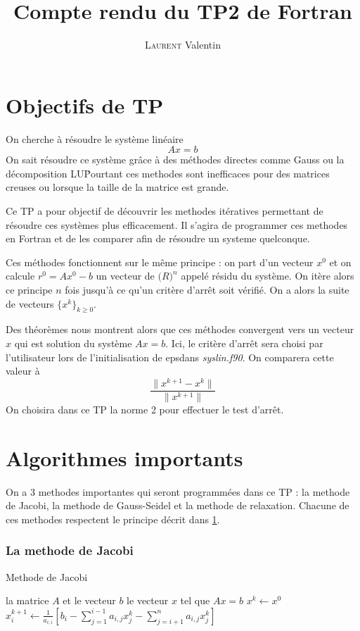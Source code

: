 \documentclass{report}
\title{Compte rendu du TP2 de Fortran}
\author{\textsc{Laurent} Valentin}
\begin{document}
\maketitle

\tableofcontents

\setcounter{chapter}{1}
\newpage
\section{Objectifs de TP}\label{objectifs}
On cherche à résoudre le système linéaire
\begin{displaymath}
Ax = b
\end{displaymath}
On sait résoudre ce système grâce à des méthodes directes comme Gauss ou la décomposition LU\.
Pourtant ces methodes sont inefficaces pour des matrices creuses ou lorsque la taille de la matrice
est grande.

Ce TP a pour objectif de découvrir les methodes itératives permettant de résoudre ces systèmes plus efficacement.
Il s'agira de programmer ces methodes en Fortran et de les comparer afin de résoudre un systeme quelconque.

Ces méthodes fonctionnent sur le même principe : on part d'un vecteur $x^0$ et on calcule $r^0 = Ax^0-b$ un vecteur
de $\mathbb(R)^n$ appelé résidu du système. On itère alors ce principe $n$ fois jusqu'à ce qu'un critère d'arrêt soit 
vérifié. On a alors la suite de vecteurs $\{x^k\}_{k \geq 0}$.

Des théorèmes nous montrent alors que ces méthodes convergent vers un vecteur $x$ qui est solution du système $Ax = b$.
Ici, le critère d'arrêt sera choisi par l'utilisateur lors de l'initialisation de \og eps\fg dans \textit{syslin.f90}.
On comparera cette valeur à
\begin{displaymath}
\frac{\| x^{k+1} - x^{k} \|}{\| x^{k+1} \|}
\end{displaymath}
On choisira dans ce TP la norme 2 pour effectuer le test d'arrêt.

\section{Algorithmes importants}\label{algo}
On a 3 methodes importantes qui seront programmées dans ce TP : la methode de Jacobi, la methode de Gauss-Seidel 
et la methode de relaxation. Chacune de ces methodes respectent le principe décrit dans \ref{objectifs}.

\subsubsection{La methode de Jacobi}
\begin{algorithm}
\caption{Methode de Jacobi}
\begin{algorithmic} 
\REQUIRE la matrice $A$ et le vecteur $b$
\ENSURE le vecteur $x$ tel que $Ax = b$
\STATE $x^k \leftarrow x^0$
\STATE $x^{k+1}_{i} \leftarrow \frac{1}{a_{i,i}} [b_i - \displaystyle\sum^{i-1}_{j=1}{a_{i,j}x^{k}_{j}} - \displaystyle\sum^{n}_{j=i+1}{a_{i,j}x^{k}_{j}}]$
\ENDFOR
\ENDWHILE
\end{algorithmic}
\end{algorithm}
\end{document}
